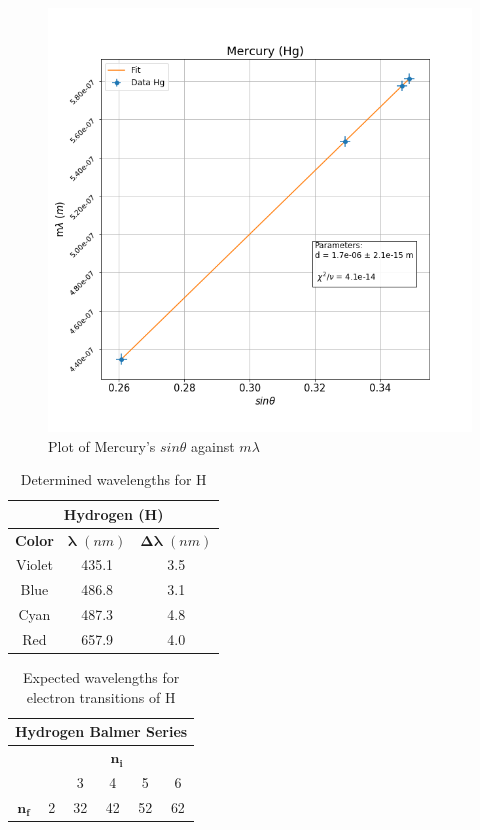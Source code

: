 \documentclass[a4paper, twocolumn]{article}
\begin{document}
\begin{figure}[h!]
 \centering
 \includegraphics[scale = 0.4]{mercury}
 \caption{Plot of Mercury's $sin\theta$ against $m\lambda$}
 \label{fig:mercury}
\end{figure}

\begin{table}[h!]
\centering
\begin{tabular}{ |c||c|c| }
 \hline
 \multicolumn{3}{|c|}{\textbf{Hydrogen (H)}} \\
 \hline
 \textbf{Color} & $\boldsymbol{\lambda}$ $(nm)$ & $\boldsymbol{\Delta\lambda}$ $(nm)$ \\
 \hline
 Violet & 435.1 & 3.5 \\
 \hline
 Blue & 486.8 & 3.1 \\
 \hline
 Cyan & 487.3 & 4.8 \\ 
 \hline
 Red & 657.9 & 4.0 \\
 \hline
\end{tabular}
\caption{Determined wavelengths for H}
\label{table:lambdaH}
\end{table}

\begin{table}[h!]
\centering
\begin{tabular}{ |c|c|c|c|c|c| }
 \hline
 \multicolumn{6}{|c|}{\textbf{Hydrogen Balmer Series}} \\
 \hline
  & \multicolumn{5}{|c|}{$\boldsymbol{n_i}$} \\
 \hline
  & & 3 & 4 & 5 & 6 \\
 \hline
 $\boldsymbol{n_f}$ & 2 & 32 & 42 & 52 & 62 \\
 \hline
\end{tabular}
\caption{Expected wavelengths for electron transitions of H}
\label{table:lambdaH}
\end{table}
\end{document}
